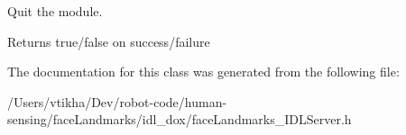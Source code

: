Quit the module. 

\begin{DoxyReturn}{Returns}
true/false on success/failure 
\end{DoxyReturn}


The documentation for this class was generated from the following file\+:\begin{DoxyCompactItemize}
\item 
/\+Users/vtikha/\+Dev/robot-\/code/human-\/sensing/face\+Landmarks/idl\+\_\+dox/face\+Landmarks\+\_\+\+I\+D\+L\+Server.\+h\end{DoxyCompactItemize}
